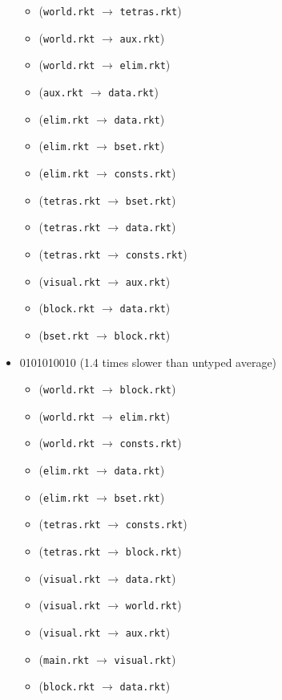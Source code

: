 \documentclass{article}
\newcommand{\mono}[1]{\texttt{#1}}
\begin{document}
\begin{itemize}
\begin{itemize}
  \item (\mono{world.rkt} $\rightarrow$ \mono{tetras.rkt})
  \item (\mono{world.rkt} $\rightarrow$ \mono{aux.rkt})
  \item (\mono{world.rkt} $\rightarrow$ \mono{elim.rkt})
  \item (\mono{aux.rkt} $\rightarrow$ \mono{data.rkt})
  \item (\mono{elim.rkt} $\rightarrow$ \mono{data.rkt})
  \item (\mono{elim.rkt} $\rightarrow$ \mono{bset.rkt})
  \item (\mono{elim.rkt} $\rightarrow$ \mono{consts.rkt})
  \item (\mono{tetras.rkt} $\rightarrow$ \mono{bset.rkt})
  \item (\mono{tetras.rkt} $\rightarrow$ \mono{data.rkt})
  \item (\mono{tetras.rkt} $\rightarrow$ \mono{consts.rkt})
  \item (\mono{visual.rkt} $\rightarrow$ \mono{aux.rkt})
  \item (\mono{block.rkt} $\rightarrow$ \mono{data.rkt})
  \item (\mono{bset.rkt} $\rightarrow$ \mono{block.rkt})
  \end{itemize}
\item 0101010010 (1.4 times slower than untyped average)
  \begin{itemize}
  \item (\mono{world.rkt} $\rightarrow$ \mono{block.rkt})
  \item (\mono{world.rkt} $\rightarrow$ \mono{elim.rkt})
  \item (\mono{world.rkt} $\rightarrow$ \mono{consts.rkt})
  \item (\mono{elim.rkt} $\rightarrow$ \mono{data.rkt})
  \item (\mono{elim.rkt} $\rightarrow$ \mono{bset.rkt})
  \item (\mono{tetras.rkt} $\rightarrow$ \mono{consts.rkt})
  \item (\mono{tetras.rkt} $\rightarrow$ \mono{block.rkt})
  \item (\mono{visual.rkt} $\rightarrow$ \mono{data.rkt})
  \item (\mono{visual.rkt} $\rightarrow$ \mono{world.rkt})
  \item (\mono{visual.rkt} $\rightarrow$ \mono{aux.rkt})
  \item (\mono{main.rkt} $\rightarrow$ \mono{visual.rkt})
  \item (\mono{block.rkt} $\rightarrow$ \mono{data.rkt})

\end{itemize}
\end{itemize}
\end{document}
